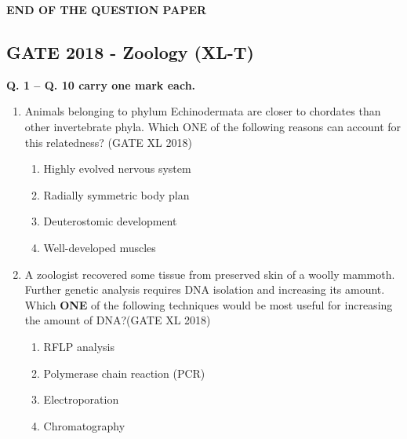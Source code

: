 \documentclass[14pt]{extarticle}
\begin{document}
\begin{flushleft}
\begin{enumerate}
\end{enumerate}
\begin{center}
    \textbf{END OF THE QUESTION PAPER}
\end{center}
\clearpage

\begin{center}
\section*{GATE 2018 - Zoology (XL-T)}
\end{center}

\textbf{Q. 1 – Q. 10 carry one mark each.}\vspace{0.5em}


\begin{enumerate}
    \item Animals belonging to phylum Echinodermata are closer to chordates than other invertebrate phyla. Which ONE of the following reasons can account for this relatedness? \hfill(GATE XL 2018)\\
    \begin{multicols}{2}
    \begin{enumerate}
        \item Highly evolved nervous system
        \item Radially symmetric body plan
        \item Deuterostomic development
        \item Well-developed muscles
    \end{enumerate}
    \end{multicols}

    \item A zoologist recovered some tissue from preserved skin of a woolly mammoth. Further genetic analysis requires DNA isolation and increasing its amount. Which \textbf{ONE} of the following techniques would be most useful for increasing the amount of DNA?\hfill(GATE XL 2018)\\
    \begin{multicols}{2}
    \begin{enumerate}
        \item RFLP analysis
        \item Polymerase chain reaction (PCR)
        \item Electroporation
        \item Chromatography
    \end{enumerate}
    \end{multicols}


\end{enumerate}
\end{flushleft}
\end{document}
